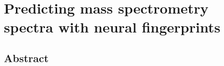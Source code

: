 \chapter{Predicting mass spectrometry spectra with neural fingerprints}
\thispagestyle{plain}
\vspace{-.5cm}

\section*{Abstract}
    \dsp
    


